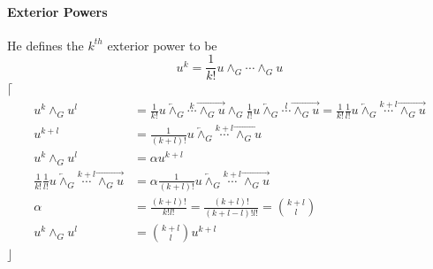 \documentclass[aps,preprint]{revtex4}%
\begin{document}
\paragraph{Exterior Powers}

He defines the $k^{th}$ exterior power to be
\[
u^{k}=\frac{1}{k!}u\wedge_{G}\cdots\wedge_{G}u
\]
$\lceil$%
\begin{align}
u^{k}\wedge_{G}u^{l}  &  =\frac{1}{k!}\overleftarrow{u\wedge_{G}%
}\overset{k}{\cdots}\overrightarrow{\wedge_{G}u}\wedge_{G}\frac{1}%
{l!}\overleftarrow{u\wedge_{G}}\overset{l}{\cdots}\overrightarrow{\wedge_{G}%
u}=\frac{1}{k!}\frac{1}{l!}\overleftarrow{u\wedge_{G}}\overset{k+l}{\cdots
}\overrightarrow{\wedge_{G}u}\\
u^{k+l}  &  =\frac{1}{\left(  k+l\right)  !}\overleftarrow{u\wedge_{G}%
}\overset{k+l}{\cdots}\overrightarrow{\wedge_{G}u}\\
u^{k}\wedge_{G}u^{l}  &  =\alpha u^{k+l}\\
\frac{1}{k!}\frac{1}{l!}\overleftarrow{u\wedge_{G}}\overset{k+l}{\cdots
}\overrightarrow{\wedge_{G}u}  &  =\alpha\frac{1}{\left(  k+l\right)
!}\overleftarrow{u\wedge_{G}}\overset{k+l}{\cdots}\overrightarrow{\wedge_{G}%
u}\\
\alpha &  =\frac{\left(  k+l\right)  !}{k!l!}=\frac{\left(  k+l\right)
!}{\left(  k+l-l\right)  !l!}=\binom{k+l}{l}\\
u^{k}\wedge_{G}u^{l}  &  =\binom{k+l}{l}u^{k+l}%
\end{align}
$\rfloor$
\end{document}
